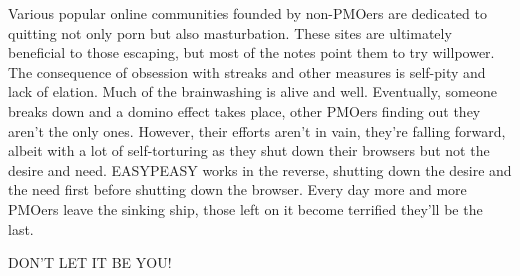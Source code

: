 \documentclass[easypeasy.tex]{subfiles}
\begin{document}
Various popular online communities founded by non-PMOers are dedicated to quitting not only porn but also masturbation. These sites are ultimately beneficial to those escaping, but most of the notes point them to try willpower. The consequence of obsession with streaks and other measures is self-pity and lack of elation. Much of the brainwashing is alive and well. Eventually, someone breaks down and a domino effect takes place, other PMOers finding out they aren't the only ones. However, their efforts aren't in vain, they're falling forward, albeit with a lot of self-torturing as they shut down their browsers but not the desire and need. EASYPEASY works in the reverse, shutting down the desire and the need first before shutting down the browser. Every day more and more PMOers leave the sinking ship, those left on it become terrified they'll be the last.

{\huge DON'T LET IT BE YOU!}
\end{document}
